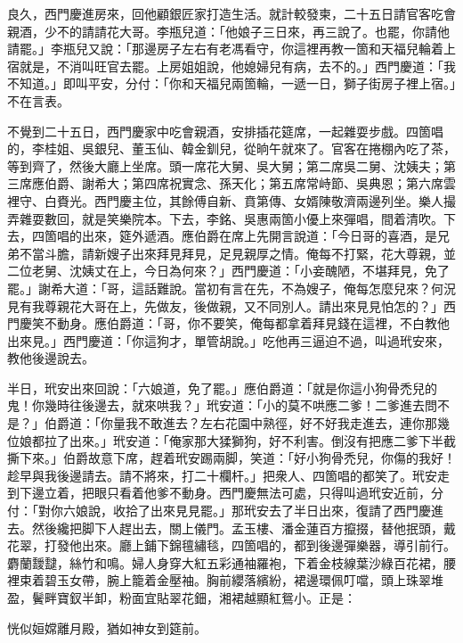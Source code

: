 良久，西門慶進房來，回他顧銀匠家打造生活。就計較發柬，二十五日請官客吃會親酒，少不的請請花大哥。李瓶兒道：「他娘子三日來，再三說了。也罷，你請他請罷。」李瓶兒又說：「那邊房子左右有老馮看守，你這裡再教一箇和天福兒輪着上宿就是，不消叫旺官去罷。上房姐姐說，他媳婦兒有病，去不的。」{}西門慶道：「我不知道。」即叫平安，分付：「你和天福兒兩箇輪，一遞一日，獅子街房子裡上宿。」不在言表。

不覺到二十五日，西門慶家中吃會親酒，安排插花筵席，一起雜耍步戲。四箇唱的，李桂姐、吳銀兒、董玉仙、韓金釧兒，從晌午就來了。官客在捲棚內吃了茶，等到齊了，然後大廳上坐席。頭一席花大舅、吳大舅；第二席吳二舅、沈姨夫；第三席應伯爵、謝希大；第四席祝實念、孫天化；第五席常峙節、吳典恩；第六席雲裡守、白賚光。西門慶主位，其餘傅自新、賁第傳、女婿陳敬濟兩邊列坐。樂人撮弄雜耍數回，就是笑樂院本。下去，李銘、吳惠兩箇小優上來彈唱，間着清吹。下去，四箇唱的出來，筵外遞酒。應伯爵在席上先開言說道：「今日哥的喜酒，是兄弟不當斗膽，請新嫂子出來拜見拜見，足見親厚之情。俺每不打緊，花大尊親，並二位老舅、沈姨丈在上，今日為何來？」西門慶道：「小妾醜陋，不堪拜見，免了罷。」謝希大道：「哥，這話難說。當初有言在先，不為嫂子，俺每怎麼兒來？何況見有我尊親花大哥在上，先做友，後做親，又不同別人。請出來見見怕怎的？」西門慶笑不動身。應伯爵道：「哥，你不要笑，俺每都拿着拜見錢在這裡，不白教他出來見。」西門慶道：「你這狗才，單管胡說。」吃他再三逼迫不過，叫過玳安來，教他後邊說去。

半日，玳安出來回說：「六娘道，免了罷。」應伯爵道：「就是你這小狗骨禿兒的鬼！你幾時往後邊去，就來哄我？」玳安道：「小的莫不哄應二爹！二爹進去問不是？」伯爵道：「你量我不敢進去？左右花園中熟徑，好不好我走進去，連你那幾位娘都拉了出來。」玳安道：「俺家那大猱獅狗，好不利害。倒沒有把應二爹下半截撕下來。」伯爵故意下席，趕着玳安踢兩脚，笑道：「好小狗骨禿兒，你傷的我好！趁早與我後邊請去。請不將來，打二十欄杆。」把衆人、四箇唱的都笑了。玳安走到下邊立着，把眼只看着他爹不動身。西門慶無法可處，只得叫過玳安近前，分付：「對你六娘說，收拾了出來見見罷。」那玳安去了半日出來，復請了西門慶進去。然後纔把脚下人趕出去，關上儀門。孟玉樓、潘金蓮百方攛掇，替他抿頭，戴花翠，打發他出來。廳上鋪下錦氊繡毯，四箇唱的，都到後邊彈樂器，導引前行。麝蘭靉靆，絲竹和鳴。婦人身穿大紅五彩通袖羅袍，下着金枝線葉沙綠百花裙，腰裡束着碧玉女帶，腕上籠着金壓袖。胸前纓落繽紛，裙邊環佩叮噹，頭上珠翠堆盈，鬢畔寶釵半卸，粉面宜貼翠花鈿，湘裙越顯紅鴛小。正是：

\begin{myquote} 
恍似姮嫦離月殿，猶如神女到筵前。
\end{myquote} 

